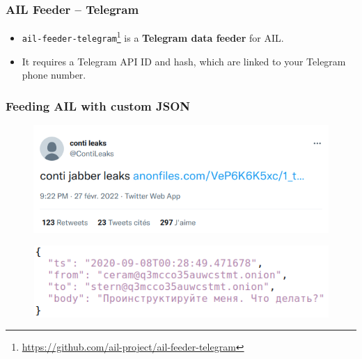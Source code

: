 \documentclass[10pt,aspectratio=169, colorlinks=true, linkcolor=circlBlue]{beamer}
\begin{document}
\begin{frame}[fragile]
    \frametitle{AIL Feeder – Telegram}

    \begin{itemize}
        \item \texttt{ail-feeder-telegram}\footnote{\url{https://github.com/ail-project/ail-feeder-telegram}} is a {\bf Telegram data feeder} for AIL.
        
        \item It requires a Telegram API ID and hash, which are linked to your Telegram phone number.
    \end{itemize}
\end{frame}




\begin{frame}[fragile]
	\frametitle{Feeding AIL with custom JSON}
	\begin{figure}[t]
		\includegraphics[width=.8\textwidth]{screenshot/contileaks-twitter.png}
		\centering
	\end{figure}

	\begin{figure}[t]
		\includegraphics[width=.6\textwidth]{screenshot/contileaks-json.png}
		\centering
	\end{figure}

\end{frame}
\end{document}
